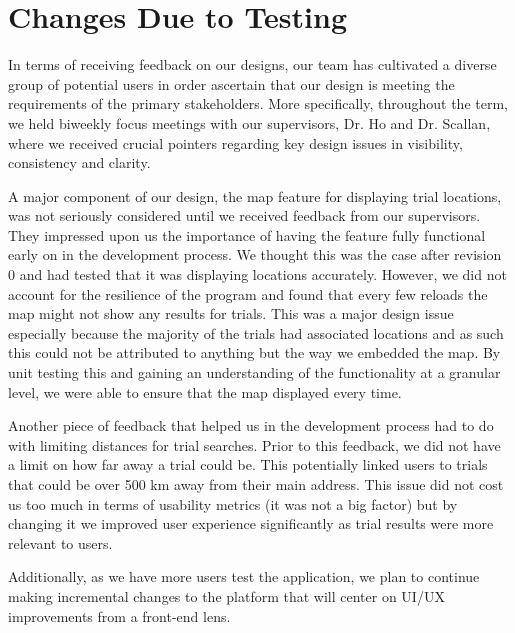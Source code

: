 \documentclass[12pt, titlepage]{article}
\begin{document}
\section{Changes Due to Testing}

In terms of receiving feedback on our designs, our team has cultivated a diverse group of potential users
in order ascertain that our design is meeting the requirements of the primary stakeholders.
More specifically, throughout the term,
we held biweekly focus meetings with our supervisors, Dr. Ho and Dr. Scallan, where we received crucial
pointers regarding key design issues in visibility, consistency and clarity. \newline

A major component of our design, the map feature for displaying trial locations,
was not seriously considered until we received feedback from our supervisors. They impressed upon
us the importance of having the feature fully functional early on in the development process.
We thought this was the case after revision 0 and had tested that it was displaying locations
accurately. However, we did not account for the resilience of the program and found that every few reloads
the map might not show any results for trials. This was a major design issue
especially because the majority of the trials had associated locations and as such this could not be
attributed to anything but the way we embedded the map.
By unit testing this and gaining an understanding of the functionality at a granular level,
we were able to ensure that the map displayed every time. \newline

Another piece of feedback that helped us in the development process
had to do with limiting distances for trial searches. Prior to this feedback,
we did not have a limit on how far away a trial could be. This potentially linked
users to trials that could be over 500 km away from their main address. This issue did not
cost us too much in terms of usability metrics (it was not a big factor) but by changing it
we improved user experience significantly as trial results were more relevant to users. \newline

Additionally, as we have more users test the application, we plan to continue making incremental changes
to the platform that will center on UI/UX improvements from a front-end lens.
\end{document}
